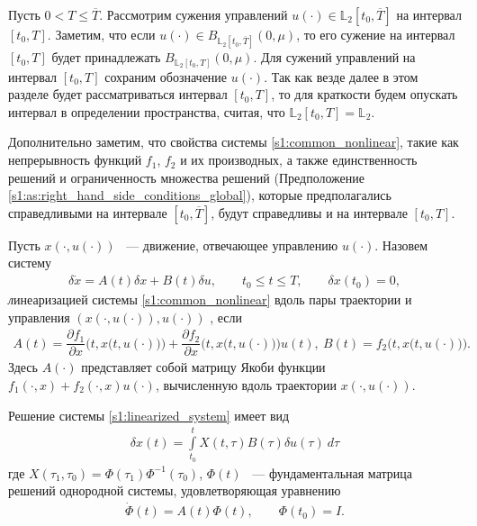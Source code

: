 \documentclass[../main.tex]{subfiles}
\begin{document}
Пусть $ 0 <  T \leqslant \overline{T} $.  
Рассмотрим сужения управлений $u(\cdot) \in \mathbb{L}_2[t_0, \overline{T}]$ на интервал $[t_0, T]$.
Заметим, что если $u(\cdot) \in B_{\mathbb{L}_2[t_0, \overline{T}]}(0,\mu) $, то его сужение на интервал $[t_0, T]$ будет принадлежать $ B_{\mathbb{L}_2[t_0, T]}(0,\mu) $.  
Для сужений управлений на интервал  $[t_0, T]$  сохраним обозначение $u(\cdot) $.
Так как везде далее в этом разделе будет рассматриваться интервал $[t_0, T]$, то для краткости будем опускать интервал в определении пространства, считая, что $\mathbb{L}_2[t_0, T] = \mathbb{L}_2$.

Дополнительно заметим, что свойства системы \eqref{s1:common_nonlinear}, такие как непрерывность функций $f_1$, $f_2$ и их производных, а также единственность решений и ограниченность множества решений (Предположение \ref{s1:as:right_hand_side_conditions_global}), которые предполагались справедливыми на интервале $[t_0, \overline{T}]$, будут справедливы и на интервале $[t_0, T]$.

\begin{definition}\label{s1:def:linearized_system}
    Пусть $ x(\cdot,u(\cdot)) $ ~--- движение, отвечающее управлению $ u(\cdot)$.
    Назовем систему
    \begin{gather}\label{s1:linearized_system}
        \delta \dot{x} =  A(t) \delta x + B(t) \delta u, \qquad t_0 \leqslant t \leqslant T, \qquad \delta x(t_0) = 0,
    \end{gather}
    {\textit линеаризацией} системы \eqref{s1:common_nonlinear} вдоль пары траектории и управления $\left( x(\cdot,u(\cdot)),u(\cdot)\right)   $ , если 
    \begin{gather*}
        A(t) = \dfrac{\partial f_1}{\partial x} \Big(t,x\big(t,u(\cdot)\big)\Big) + \dfrac{\partial f_2}{\partial x}\Big(t,x\big(t,u(\cdot)\big)\Big) u(t), \  
        B(t) = f_2 \Big(t,x\big(t,u(\cdot)\big)\Big).
    \end{gather*}
    Здесь $ A(\cdot) $ представляет собой матрицу Якоби функции $ f_1(\cdot, x) + f_2(\cdot, x) u(\cdot) $, вычисленную вдоль траектории $ x(\cdot,u(\cdot)) $.
\end{definition}

Решение системы \eqref{s1:linearized_system} имеет вид 
\begin{gather*}
\delta x(t) =  \int\limits_{t_0}^{t} X(t, \tau) B(\tau) \delta u(\tau) \ d\tau 
\end{gather*}
 где $ X(\tau_1,\tau_0)= \Phi(\tau_1) \Phi^{-1}(\tau_0) $,  $\Phi(t) $ ~--- фундаментальная матрица решений однородной системы, удовлетворяющая уравнению 
\begin{gather}\label{s1:fundumental_matrix_eq}
    \dot{\Phi}(t) = A(t) \Phi(t), \qquad \Phi(t_0) = I.
\end{gather}
\end{document}
